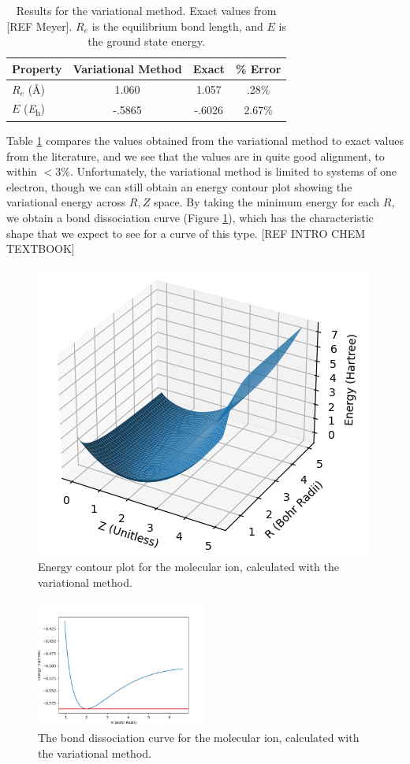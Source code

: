 \documentclass[journal=jacsat,manuscript=communication]{achemso}
\begin{document}
{\setlength{\extrarowheight}{2pt}
\begin{table}[H]
  \begin{tabular}{l|ccc}
    Property & Variational Method & Exact & \% Error \\
    \hline
    $R_e$ (\si{\angstrom}) & 1.060 & 1.057 & .28\%\\
    $E$ (\si{\hartree}) & -.5865 & -.6026 & 2.67\%
  \end{tabular}
  \caption{Results for the variational method.  Exact values from [REF Meyer].  $R_e$ is the equilibrium bond length, and $E$ is the ground state energy. }
  \label{tab:var}
\end{table}

Table \ref{tab:var} compares the values obtained from the variational method to exact values from the literature, and we see that the values are in quite good alignment, to within $<3\%$.  Unfortunately, the variational method is limited to systems of one electron, though we can still obtain an energy contour plot showing the variational energy across $R,Z$ space.  By taking the minimum energy for each $R$, we obtain a bond dissociation curve (Figure \ref{fig:var_bd}), which has the characteristic shape that we expect to see for a curve of this type.  [REF INTRO CHEM TEXTBOOK]

\begin{figure}[H]
  \includegraphics[width=.5\textwidth]{figures/variational_energy_contour.png}
  \caption{Energy contour plot for the  molecular ion, calculated with the variational method.}
\end{figure}



\begin{figure}[H]
  \includegraphics[width=0.5\textwidth]{figures/variational_dissociation.png}
  \caption{The bond dissociation curve for the  molecular ion, calculated with the variational method.}
  \label{fig:var_bd}
\end{figure}

}
\end{document}
